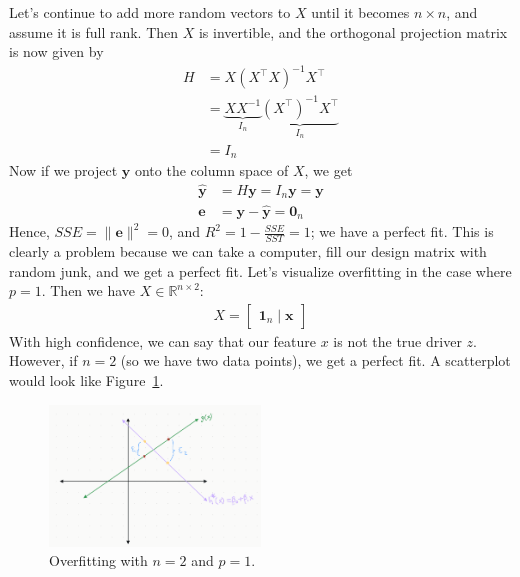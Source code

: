 \documentclass[12pt, a4paper]{article}
\theoremstyle{definition}
\begin{document}
	Let's continue to add more random vectors to $X$ until it becomes $n\times n$,
	and assume it is full rank. Then $X$ is invertible, and the orthogonal projection
	matrix is now given by
	\begin{align*}
		H
		&= X(X^\top X)^{-1}X^\top\\
		&= \underbrace{XX^{-1}}_{I_n}\underbrace{(X^\top)^{-1}X^\top}_{I_n}\\
		&=I_n
	\end{align*}
	Now if we project $\mathbf{y}$ onto the column space of $X$, we get
	\begin{align*}
		\mathbf{\hat{y}} &=H\mathbf{y}=I_n\mathbf{y}=\mathbf{y}\\
		\mathbf{e}&=\mathbf{y}-\mathbf{\hat{y}}=\mathbf{0}_n
	\end{align*}
	Hence, $SSE=\|\mathbf{e}\|^2=0$, and $R^2=1-\frac{SSE}{SST}=1$; we have a perfect fit.
	This is clearly a problem because we can take a computer, fill our design matrix
	with random junk, and we get a perfect fit. Let's visualize overfitting in the
	case where $p=1$. Then we have $X\in \mathbb{R}^{n\times 2}$:
	\begin{align*}
		X = \begin{bmatrix}
			\mathbf{1}_n \mid \mathbf{x}
		\end{bmatrix}
	\end{align*}
	With high confidence, we can say that our feature $x$ is not the true driver $z$.
	However, if $n=2$ (so we have two data points), we get a perfect fit. A scatterplot
	would look like Figure~\ref{fig:overfitting-n-2-p-1}.
	\begin{figure}
		\centering
		\includegraphics[width=0.5\textwidth]{overfitting-2-points}
		\caption{Overfitting with $n=2$ and $p=1$.}
		\label{fig:overfitting-n-2-p-1}
	\end{figure}
\end{document}

